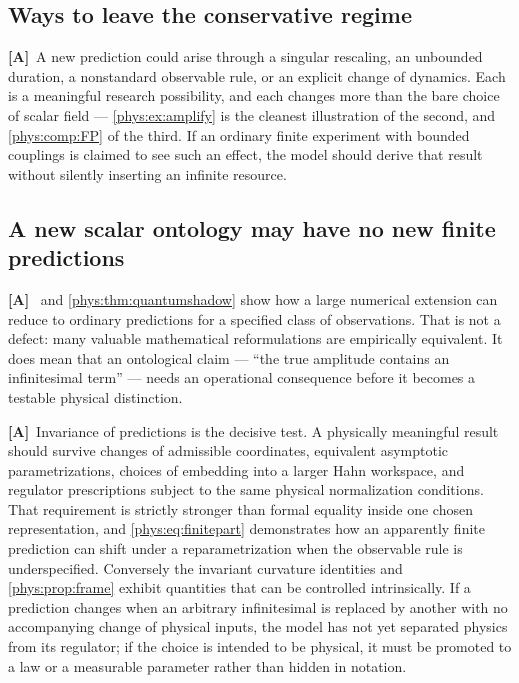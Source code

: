 \documentclass[11pt,letterpaper]{article}
\numberwithin{equation}{section}
\theoremstyle{definition}
\theoremstyle{remark}
\newcommand{\TA}{\textcolor{TierA}{\textsf{\bfseries[A]}}}
\begin{document}
\subsection{Ways to leave the conservative regime}
\label{phys:sub:leaving}

\TA\ A new prediction could arise through a singular rescaling, an unbounded
duration, a nonstandard observable rule, or an explicit change of dynamics.
Each is a meaningful research possibility, and each changes more than the bare
choice of scalar field --- \cref{phys:ex:amplify} is the cleanest illustration
of the second, and \cref{phys:comp:FP} of the third. If an ordinary finite
experiment with bounded couplings is claimed to see such an effect, the model
should derive that result without silently inserting an infinite resource.

\subsection{A new scalar ontology may have no new finite predictions}
\label{phys:sub:novelty}

\TA\  and \cref{phys:thm:quantumshadow} show how a large
numerical extension can reduce to ordinary predictions for a specified class of
observations. That is not a defect: many valuable mathematical reformulations
are empirically equivalent. It does mean that an ontological claim --- ``the
true amplitude contains an infinitesimal term'' --- needs an operational
consequence before it becomes a testable physical distinction.

\TA\ Invariance of predictions is the decisive test. A physically meaningful
result should survive changes of admissible coordinates, equivalent asymptotic
parametrizations, choices of embedding into a larger Hahn workspace, and
regulator prescriptions subject to the same physical normalization conditions.
That requirement is strictly stronger than formal equality inside one chosen
representation, and \eqref{phys:eq:finitepart} demonstrates how an apparently
finite prediction can shift under a reparametrization when the observable rule
is underspecified. Conversely the invariant curvature identities and
\cref{phys:prop:frame} exhibit quantities that can be controlled
intrinsically. If a prediction changes when an arbitrary infinitesimal is
replaced by another with no accompanying change of physical inputs, the model
has not yet separated physics from its regulator; if the choice is intended to
be physical, it must be promoted to a law or a measurable parameter rather than
hidden in notation.
\end{document}
